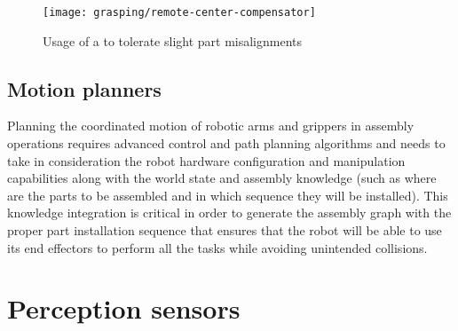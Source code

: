 \begin{figure}[H]
	\centering
	\texttt{[image: grasping/remote-center-compensator]}
	\caption[Usage of a  to tolerate slight part misalignments]{Usage of a  to tolerate slight part misalignments\protect\footnotemark}
	\label{fig:remote-center-compensator}
\end{figure}


\subsection{Motion planners}

Planning the coordinated motion of robotic arms \cite{Rickert2011} and grippers in assembly operations requires advanced control \cite{Stolt2015} and path planning algorithms \cite{Fontanals2014,You2012,mopl2015} and needs to take in consideration the robot hardware configuration and manipulation capabilities along with the world state and assembly knowledge \cite{Tenorth14} (such as where are the parts to be assembled and in which sequence they will be installed). This knowledge integration is critical in order to generate the assembly graph with the proper part installation sequence that ensures that the robot will be able to use its end effectors to perform all the tasks \cite{Thomas2003ATP,Thomas2011} while avoiding unintended collisions.





\section{Perception sensors}

